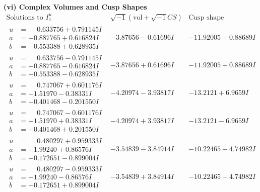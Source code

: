 \documentclass[1p]{elsarticle_modified}
\theoremstyle{definition}
\newcommand{\I}{\sqrt{-1}}
\begin{document}
\newpage\flushleft \textbf{(vi) Complex Volumes and Cusp Shapes}
$$\begin{array}{c|c|c}  
\text{Solutions to }I^u_{1}& \I (\text{vol} + \sqrt{-1}CS) & \text{Cusp shape}\\
 \hline 
\begin{aligned}
u &= \phantom{-}0.633756 + 0.791145 I \\
a &= -0.887765 + 0.616824 I \\
b &= -0.553388 + 0.628935 I\end{aligned}
 & -3.87656 - 0.61696 I & -11.92005 - 0.88689 I \\ \hline\begin{aligned}
u &= \phantom{-}0.633756 - 0.791145 I \\
a &= -0.887765 - 0.616824 I \\
b &= -0.553388 - 0.628935 I\end{aligned}
 & -3.87656 + 0.61696 I & -11.92005 + 0.88689 I \\ \hline\begin{aligned}
u &= \phantom{-}0.747067 + 0.601176 I \\
a &= -1.51970 - 0.38331 I \\
b &= -0.401468 - 0.201550 I\end{aligned}
 & -4.20974 - 3.93817 I & -13.2121 + 6.9659 I \\ \hline\begin{aligned}
u &= \phantom{-}0.747067 - 0.601176 I \\
a &= -1.51970 + 0.38331 I \\
b &= -0.401468 + 0.201550 I\end{aligned}
 & -4.20974 + 3.93817 I & -13.2121 - 6.9659 I \\ \hline\begin{aligned}
u &= \phantom{-}0.480297 + 0.959333 I \\
a &= -1.99240 + 0.86576 I \\
b &= -0.172651 - 0.899004 I\end{aligned}
 & -3.54839 - 3.84914 I & -10.22465 + 4.74982 I \\ \hline\begin{aligned}
u &= \phantom{-}0.480297 - 0.959333 I \\
a &= -1.99240 - 0.86576 I \\
b &= -0.172651 + 0.899004 I\end{aligned}
 & -3.54839 + 3.84914 I & -10.22465 - 4.74982 I \\ \hline\begin{aligned}

\end{aligned}
\end{array}$$
\end{document}
